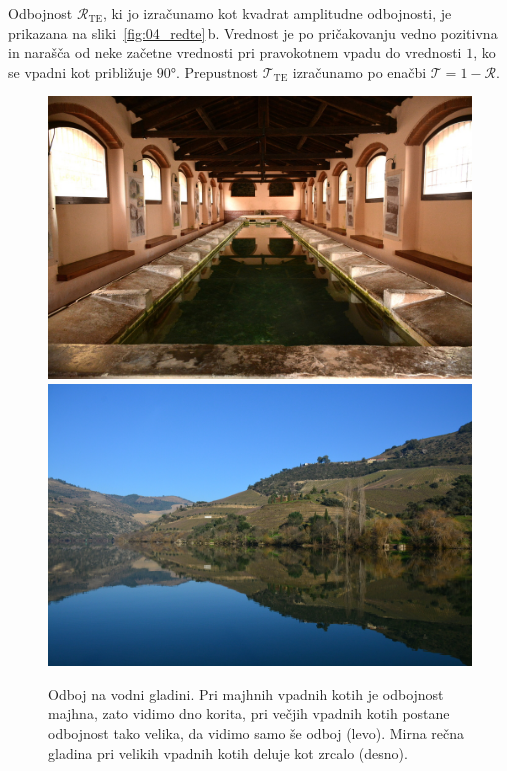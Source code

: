 Odbojnost $\mathcal{R}_\mathrm{TE}$, ki jo izračunamo kot kvadrat amplitudne odbojnosti,
je prikazana na sliki~\ref{fig:04_redte}\,b. Vrednost je po pričakovanju 
vedno pozitivna in narašča od neke začetne vrednosti pri pravokotnem
vpadu do vrednosti $1$, ko se vpadni kot približuje $90\si{\degree}$. Prepustnost
$\mathcal{T}_\mathrm{TE}$ izračunamo po enačbi $\mathcal{T} = 1 -\mathcal{R}$. 
\begin{figure}[ht]
\centering
\includegraphics[width=7truecm]{slike/04_OdbojFoto.jpg}\hfill
\includegraphics[width=7truecm]{slike/04_Douro.jpeg}
\caption{Odboj na vodni gladini. Pri majhnih vpadnih kotih je odbojnost
majhna, zato vidimo dno korita, pri večjih
vpadnih kotih postane odbojnost tako velika, da vidimo samo še odboj (levo).
Mirna rečna gladina pri velikih vpadnih kotih deluje kot zrcalo (desno).}
\label{fig:04_OdbojFoto}
\end{figure}


